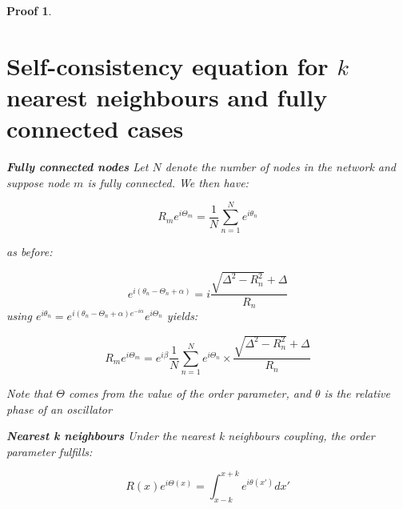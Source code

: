 \documentclass{article}
\newtheorem{pf}{Proof}[section]
\begin{document}
\begin{pf}
\section{Self-consistency equation for $k$ nearest neighbours and fully connected cases}

\textbf{Fully connected nodes} \; Let $N$ denote the number of nodes in the network and suppose node $m$ is fully connected. We then have:

\begin{equation}
R_me^{i\Theta_m} = \frac{1}{N}\sum\limits_{n=1}^{N} e^{i\theta_n}
\end{equation}

as before:

$$e^{i(\theta_n-\Theta_n +\alpha)} = i \frac{\sqrt{\Delta^2-R_n^2}+\Delta}{R_n}$$
using $e^{i\theta_n}= e^{i(\theta_n-\Theta_n+\alpha)e^{-i\alpha}}e^{i\Theta_n}$ yields:

$$R_me^{i\Theta_m} = e^{i\beta} \frac{1}{N}\sum\limits_{n=1}^{N} e^{i\Theta_n}\times \frac{\sqrt{\Delta^2-R_n^2}+\Delta}{R_n}$$

Note that $\Theta$ comes from the value of the order parameter, and $\theta$ is the relative phase of an oscillator

\textbf{Nearest k neighbours} \; Under the nearest k neighbours coupling, the order parameter fulfills:

\begin{equation}
R(x)e^{i\Theta(x)} = \int_{x-k}^{x+k}e^{i\theta(x')}dx'
\end{equation}

\end{pf}
\end{document}
